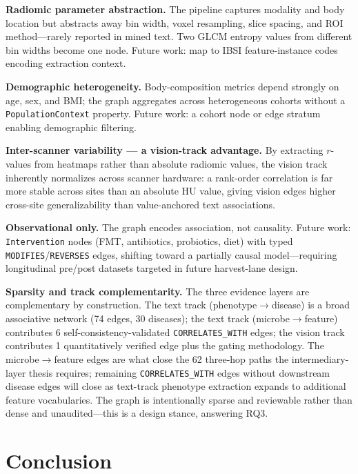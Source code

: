 \documentclass[10pt,twocolumn,letterpaper]{article}
\begin{document}
\noindent\textbf{Radiomic parameter abstraction.} The pipeline captures
modality and body location but abstracts away bin width, voxel resampling,
slice spacing, and ROI method---rarely reported in mined text. Two GLCM
entropy values from different bin widths become one node. Future work: map to
IBSI feature-instance codes encoding extraction context.

\noindent\textbf{Demographic heterogeneity.} Body-composition metrics depend
strongly on age, sex, and BMI; the graph aggregates across heterogeneous
cohorts without a \texttt{PopulationContext} property. Future work: a cohort
node or edge stratum enabling demographic filtering.

\noindent\textbf{Inter-scanner variability --- a vision-track advantage.} By
extracting $r$-values from heatmaps rather than absolute radiomic values, the
vision track inherently normalizes across scanner hardware: a rank-order
correlation is far more stable across sites than an absolute HU value, giving
vision edges higher cross-site generalizability than value-anchored text
associations.

\noindent\textbf{Observational only.} The graph encodes association, not
causality. Future work: \texttt{Intervention} nodes (FMT, antibiotics,
probiotics, diet) with typed \texttt{MODIFIES}/\texttt{REVERSES} edges,
shifting toward a partially causal model---requiring longitudinal
pre/post datasets targeted in future harvest-lane design.

\noindent\textbf{Sparsity and track complementarity.} The three evidence
layers are complementary by construction. The text track
(phenotype$\rightarrow$disease) is a broad associative network (74 edges, 30
diseases); the text track (microbe$\rightarrow$feature) contributes 6
self-consistency-validated \texttt{CORRELATES\_WITH} edges; the vision track
contributes 1 quantitatively verified edge plus the gating methodology. The
microbe$\rightarrow$feature edges are what close the 62 three-hop paths the
intermediary-layer thesis requires; remaining \texttt{CORRELATES\_WITH} edges
without downstream disease edges will close as text-track phenotype
extraction expands to additional feature vocabularies. The graph is
intentionally sparse and reviewable rather than dense and unaudited---this is
a design stance, answering RQ3.

\section{Conclusion}
\end{document}
